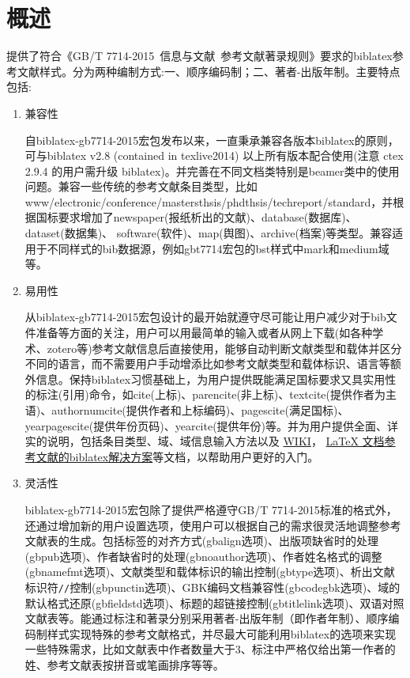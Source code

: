 \section{概述}
提供了符合《GB/T 7714-2015~信息与文献~参考文献著录规则》要求的biblatex参考文献样式。分为两种编制方式:一、顺序编码制；二、著者-出版年制。主要特点包括:
\begin{enumerate}
  \item 兼容性

自biblatex-gb7714-2015宏包发布以来，一直秉承兼容各版本biblatex的原则，可与biblatex v2.8 (contained in texlive2014) 以上所有版本配合使用(注意 ctex 2.9.4 的用户需升级 biblatex)。并完善在不同文档类特别是beamer类中的使用问题。兼容一些传统的参考文献条目类型，比如www/electronic/conference/mastersthsis/phdthsis/techreport/standard，并根据国标要求增加了newspaper(报纸析出的文献)、database(数据库)、dataset(数据集)、 software(软件)、map(舆图)、archive(档案)等类型。兼容适用于不同样式的bib数据源，例如gbt7714宏包的bst样式中mark和medium域等。

  \item 易用性

从biblatex-gb7714-2015宏包设计的最开始就遵守尽可能让用户减少对于bib文件准备等方面的关注，用户可以用最简单的输入或者从网上下载(如各种学术、zotero等)参考文献信息后直接使用，能够自动判断文献类型和载体并区分不同的语言，而不需要用户手动增添比如参考文献类型和载体标识、语言等额外信息。保持biblatex习惯基础上，为用户提供既能满足国标要求又具实用性的标注(引用)命令，如cite(上标)、parencite(非上标)、textcite(提供作者为主语)、authornumcite(提供作者和上标编码)、pagescite(满足国标)、yearpagescite(提供年份页码)、yearcite(提供年份)等。并为用户提供全面、详实的说明，包括条目类型、域、域信息输入方法以及
\href{https://github.com/hushidong/biblatex-gb7714-2015/wiki}{WIKI}，
\href{https://github.com/hushidong/biblatex-solution-to-latex-bibliography/blob/master/biblatex-solution-to-latex-bibliography.pdf}{LaTeX 文档参考文献的biblatex解决方案}等文档，以帮助用户更好的入门。

  \item 灵活性

biblatex-gb7714-2015宏包除了提供严格遵守GB/T 7714-2015标准的格式外，还通过增加新的用户设置选项，使用户可以根据自己的需求很灵活地调整参考文献表的生成。包括标签的对齐方式(gbalign选项)、出版项缺省时的处理(gbpub选项)、作者缺省时的处理(gbnoauthor选项)、作者姓名格式的调整(gbnamefmt选项)、文献类型和载体标识的输出控制(gbtype选项)、析出文献标识符\texttt{//}控制(gbpunctin选项)、GBK编码文档兼容性(gbcodegbk选项)、域的默认格式还原(gbfieldstd选项)、标题的超链接控制(gbtitlelink选项)、双语对照文献表等。能通过标注和著录分别采用著者-出版年制（即作者年制）、顺序编码制样式实现特殊的参考文献格式，并尽最大可能利用biblatex的选项来实现一些特殊需求，比如文献表中作者数量大于3、标注中严格仅给出第一作者的姓、参考文献表按拼音或笔画排序等等。
\end{enumerate}

